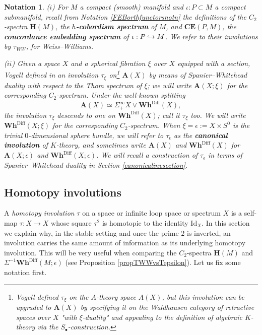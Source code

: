 \documentclass[a4paper, oneside]{amsart}
\newcommand{\diff}{\mathrm{Diff}}
\newcommand{\Id}{\mathrm{Id}}
\newcommand{\1}{\mathds{1}}
\newtheorem{notn}[thm]{Notation}
\theoremstyle{remark}
\theoremstyle{definition}
\newcommand{\Asp}{\mathbf{A}}
\newcommand{\Hsp}{\mathbf{H}}
\newcommand{\CEsp}{\mathbf{CE}}
\newcommand{\Whsp}{\mathbf{Wh}^{\diff}}
\numberwithin{equation}{section}
\begin{document}
\begin{notn}\label{involutionnotn}($i$)\hspace{1.5pt} For $M$ a compact (smooth) manifold and $\iota: P\subset M$ a compact submanifold, recall from Notation \ref{FEBorthfunctorsnotn} the definitions of the $C_2$-spectra $\Hsp(M)$, the \textbf{$h$-cobordism spectrum} of $M$, and $\CEsp(P,M)$, the \textbf{concordance embedding spectrum} of $\iota:P\xhookrightarrow{}M$. We refer to their involutions by $\tau_{WW}$, for Weiss--Williams. 

\vspace{4pt}

\noindent($ii$)\hspace{1.5pt} Given a space $X$ and a spherical fibration $\xi$ over $X$ equipped with a section, Vogell defined in \cite[p. 300]{VogellInvolution} an involution $\tau_\xi$ on\footnote{Vogell defined $\tau_\xi$ on the $A$-theory space $A(X)$, but this involution can be upgraded to $\Asp(X)$ by specifying it on the Waldhausen category of retractive spaces over $X$ "with $\xi$-duality" and appealing to the definition of algebraic $K$-theory via the $S_\bullet$-construction.} $\Asp(X)$ by means of Spanier--Whitehead duality with respect to the Thom spectrum of $\xi$; we will write $\Asp(X;\xi)$ for the corresponding $C_2$-spectrum. Under the well-known splitting
\begin{equation}\label{splittingAspectrum}
\Asp(X)\simeq \Sigma^\infty_+X\vee \Whsp(X),
\end{equation}
the involution $\tau_\xi$ descends to one on $\Whsp(X)$; call it $\tau_\xi$ too. We will write $\Whsp(X;\xi)$ for the corresponding $C_2$-spectrum. When $\xi=\epsilon:=X\times S^0$ is the trivial $0$-dimensional sphere bundle, we will refer to $\tau_\epsilon$ as the \textbf{canonical involution} of $K$-theory, and sometimes write $\Asp(X)$ and $\Whsp(X)$ for $\Asp(X;\epsilon)$ and $\Whsp(X;\epsilon)$. We will recall a construction of $\tau_\epsilon$ in terms of Spanier--Whitehead duality in Section \ref{canonicalinvsection}.
\end{notn}






\subsection{Homotopy involutions}\label{homotopyinvsection} A \textit{homotopy involution} $\tau$ on a space or infinite loop space or spectrum $X$ is a self-map $\tau: X\to X$ whose square $\tau^2$ is homotopic to the identity $\Id_X$. In this section we explain why, in the stable setting and once the prime $2$ is inverted, an involution carries the same amount of information as its underlying homotopy involution. This will be very useful when comparing the $C_2$-spectra $\Hsp(M)$ and $\Sigma^{-1}\Whsp(M;\epsilon)$ (see Proposition \ref{propTWWvsTepsilon}). Let us fix some notation first. 
\end{document}
